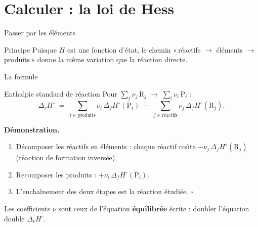 \documentclass[aspectratio=169,10pt]{beamer}
\newcommand{\dfH}{\Delta_{f}H^{\circ}}
\newcommand{\drH}{\Delta_{r}H^{\circ}}
\newcommand{\guil}[1]{«\,#1\,»}
\begin{document}
\section{Calculer : la loi de Hess}

\begin{frame}{Passer par les éléments}
  \centering

  \vspace{2mm}
  \begin{block}{Principe}
    Puisque $H$ est une fonction d'état, le chemin \guil{réactifs $\to$
    éléments $\to$ produits} donne la même variation que la réaction directe.
  \end{block}
\end{frame}

\begin{frame}{La formule}
  \begin{block}{Enthalpie standard de réaction}
    Pour $\sum_j \nu_j \,\mathrm{R}_j \;\to\; \sum_i \nu_i\,\mathrm{P}_i$ :
    \[
      \drH \;=\; \sum_{i\in\text{produits}} \nu_i\,\dfH(\mathrm{P}_i)
      \;-\; \sum_{j\in\text{réactifs}} \nu_j\,\dfH(\mathrm{R}_j).
    \]
  \end{block}
  \vspace{1mm}
  \textbf{Démonstration.}
  \begin{enumerate}
    \item Décomposer les réactifs en éléments : chaque réactif coûte
      $-\nu_j\,\dfH(\mathrm{R}_j)$ (réaction de formation inversée).
    \item Recomposer les produits : $+\nu_i\,\dfH(\mathrm{P}_i)$.
    \item L'enchaînement des deux étapes est la réaction étudiée. $\square$
  \end{enumerate}
  \vspace{1mm}
  {\footnotesize Les coefficients $\nu$ sont ceux de l'équation \textbf{équilibrée}
  écrite : doubler l'équation double $\drH$.}
\end{frame}
\end{document}
